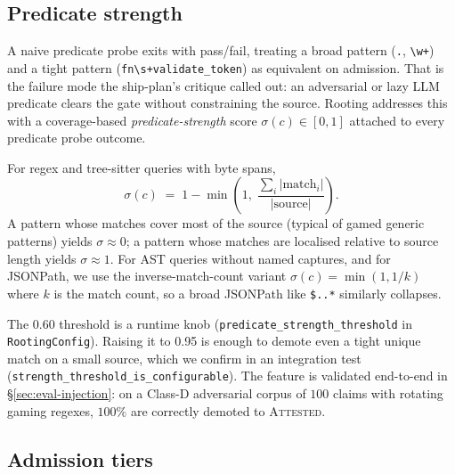 \documentclass[10pt,a4paper]{article}
\begin{document}
\subsection{Predicate strength}
\label{sec:strength}

A naive predicate probe exits with pass/fail, treating a broad pattern
(\texttt{.}, \texttt{\textbackslash w+}) and a tight pattern
(\texttt{fn\textbackslash s+validate\_token}) as equivalent on admission.
That is the failure mode the ship-plan's critique called out: an
adversarial or lazy LLM predicate clears the gate without constraining
the source. Rooting addresses this with a coverage-based
\emph{predicate-strength} score $\sigma(c) \in [0, 1]$ attached to every
predicate probe outcome.

For regex and tree-sitter queries with byte spans,
\[
  \sigma(c) \;=\; 1 - \min\!\left(1,\; \frac{\sum_i |\text{match}_i|}{|\text{source}|}\right).
\]
A pattern whose matches cover most of the source (typical of gamed
generic patterns) yields $\sigma \approx 0$; a pattern whose matches are
localised relative to source length yields $\sigma \approx 1$. For AST
queries without named captures, and for JSONPath, we use the
inverse-match-count variant
$\sigma(c) = \min(1, 1/k)$ where $k$ is the match count, so a broad
JSONPath like \texttt{\$..*} similarly collapses.

The 0.60 threshold is a runtime knob
(\texttt{predicate\_strength\_threshold} in \texttt{RootingConfig}).
Raising it to 0.95 is enough to demote even a tight unique match on a
small source, which we confirm in an integration test
(\texttt{strength\_threshold\_is\_configurable}). The feature is
validated end-to-end in §\ref{sec:eval-injection}: on a Class-D
adversarial corpus of $100$ claims with rotating gaming regexes, $100\%$
are correctly demoted to \textsc{Attested}.

\subsection{Admission tiers}
\label{sec:tiers}
\end{document}
